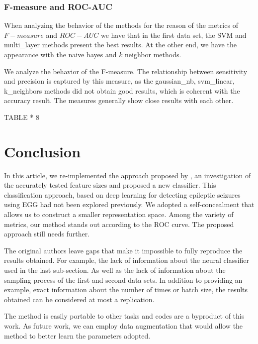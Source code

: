 \subsubsection{F-measure and ROC-AUC}

When analyzing the behavior of the methods for the reason of the metrics of $ F-measure $ and $ ROC-AUC $ we have that in the first data set, the SVM and multi\_layer methods present the best results. At the other end, we have the appearance with the naive bayes and $k$ neighbor methods.

We analyze the behavior of the F-measure. The relationship between sensitivity and precision is captured by this measure, as the gaussian\_nb, svm\_linear, k\_neighbors methods did not obtain good results, which is coherent with the accuracy result. The measures generally show close results with each other. 

TABLE * 8


\newpage

\section{Conclusion}\label{sec:concl}
In this article, we re-implemented the approach proposed by \cite{WenZha:2018}, an investigation of the accurately tested feature sizes and proposed a new classifier. This classification approach, based on deep learning for detecting epileptic seizures using EGG had not been explored previously. We adopted a self-concealment that allows us to construct a smaller representation space. Among the variety of metrics, our method stands out according to the ROC curve. The proposed approach still needs further.

The original authors leave gaps that make it impossible to fully reproduce the results obtained. For example, the lack of information about the neural classifier used in the last sub-section. As well as the lack of information about the sampling process of the first and second data sets. In addition to providing an example, exact information about the number of times or batch size, the results obtained can be considered at most a replication.


The method is easily portable to other tasks and codes are a byproduct of this work. As future work, we can employ data augmentation that would allow the method to better learn the parameters adopted.

